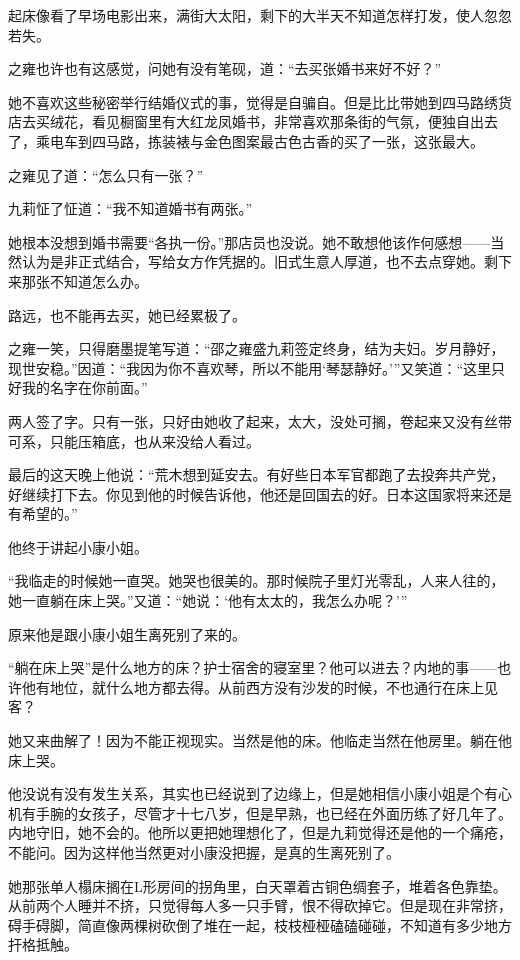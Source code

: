 \par 起床像看了早场电影出来，满街大太阳，剩下的大半天不知道怎样打发，使人忽忽若失。
\par 之雍也许也有这感觉，问她有没有笔砚，道：“去买张婚书来好不好？”
\par 她不喜欢这些秘密举行结婚仪式的事，觉得是自骗自。但是比比带她到四马路绣货店去买绒花，看见橱窗里有大红龙凤婚书，非常喜欢那条街的气氛，便独自出去了，乘电车到四马路，拣装裱与金色图案最古色古香的买了一张，这张最大。
\par 之雍见了道：“怎么只有一张？”
\par 九莉怔了怔道：“我不知道婚书有两张。”
\par 她根本没想到婚书需要“各执一份。”那店员也没说。她不敢想他该作何感想——当然认为是非正式结合，写给女方作凭据的。旧式生意人厚道，也不去点穿她。剩下来那张不知道怎么办。
\par 路远，也不能再去买，她已经累极了。
\par 之雍一笑，只得磨墨提笔写道：“邵之雍盛九莉签定终身，结为夫妇。岁月静好，现世安稳。”因道：“我因为你不喜欢琴，所以不能用‘琴瑟静好。'”又笑道：“这里只好我的名字在你前面。”
\par 两人签了字。只有一张，只好由她收了起来，太大，没处可搁，卷起来又没有丝带可系，只能压箱底，也从来没给人看过。
\par 最后的这天晚上他说：“荒木想到延安去。有好些日本军官都跑了去投奔共产党，好继续打下去。你见到他的时候告诉他，他还是回国去的好。日本这国家将来还是有希望的。”
\par 他终于讲起小康小姐。
\par “我临走的时候她一直哭。她哭也很美的。那时候院子里灯光零乱，人来人往的，她一直躺在床上哭。”又道：“她说：‘他有太太的，我怎么办呢？'”
\par 原来他是跟小康小姐生离死别了来的。
\par “躺在床上哭”是什么地方的床？护士宿舍的寝室里？他可以进去？内地的事——也许他有地位，就什么地方都去得。从前西方没有沙发的时候，不也通行在床上见客？
\par 她又来曲解了！因为不能正视现实。当然是他的床。他临走当然在他房里。躺在他床上哭。
\par 他没说有没有发生关系，其实也已经说到了边缘上，但是她相信小康小姐是个有心机有手腕的女孩子，尽管才十七八岁，但是早熟，也已经在外面历练了好几年了。内地守旧，她不会的。他所以更把她理想化了，但是九莉觉得还是他的一个痛疮，不能问。因为这样他当然更对小康没把握，是真的生离死别了。
\par 她那张单人榻床搁在L形房间的拐角里，白天罩着古铜色绸套子，堆着各色靠垫。从前两个人睡并不挤，只觉得每人多一只手臂，恨不得砍掉它。但是现在非常挤，碍手碍脚，简直像两棵树砍倒了堆在一起，枝枝桠桠磕磕碰碰，不知道有多少地方扞格抵触。
